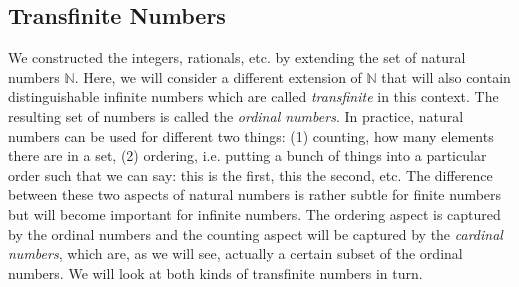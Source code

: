 







\subsection{Transfinite Numbers}
We constructed the integers, rationals, etc. by extending the set of natural numbers $\mathbb{N}$. Here, we will consider a different extension of $\mathbb{N}$ that will also contain distinguishable infinite numbers which are called \emph{transfinite} in this context. The resulting set of numbers is called the \emph{ordinal numbers}. In practice, natural numbers can be used for different two things: (1) counting, how many elements there are in a set, (2) ordering, i.e. putting a bunch of things into a particular order such that we can say: this is the first, this the second, etc. The difference between these two aspects of natural numbers is rather subtle for finite numbers but will become important for infinite numbers. The ordering aspect is captured by the ordinal numbers and the counting aspect will be captured by the \emph{cardinal numbers}, which are, as we will see, actually a certain subset of the ordinal numbers. We will look at both kinds of transfinite numbers in turn.





